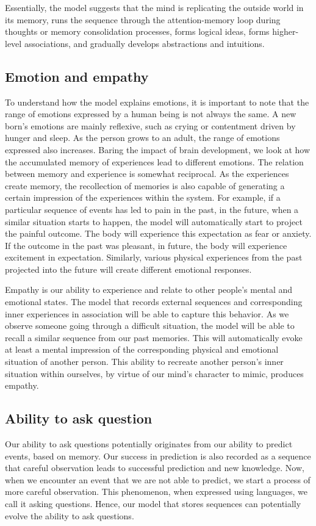 \documentclass[reprint,amsmath,amssymb,apr,aip,onecolumn, 11pt]{revtex4-1}
\begin{document}
 Essentially, the model suggests that the mind is replicating the outside world in its memory, runs the sequence through the attention-memory loop during thoughts or memory consolidation processes, forms logical ideas, forms higher-level associations, and gradually develops abstractions and intuitions. 



\subsection{Emotion and empathy}
To understand how the model explains emotions, it is important to note that the range of emotions expressed by a human being is not always the same. A new born's emotions are mainly reflexive, such as crying or contentment driven by hunger and sleep. As the person grows to an adult, the range of emotions expressed also increases\cite{Berk_2017}. Baring the impact of brain development, we look at how the accumulated memory of experiences lead to different emotions. The relation between memory and experience is somewhat reciprocal. As the experiences create memory, the recollection of memories is also capable of generating a certain impression of the experiences within the system.  For example, if a particular sequence of events has led to pain in the past, in the future, when a similar situation starts to happen, the model will automatically start to project the painful outcome. The body will experience this expectation as fear or anxiety. If the outcome in the past was pleasant, in future, the body will experience excitement in expectation. Similarly, various physical experiences from the past projected into the future will create different emotional responses.

Empathy is our ability to experience and relate to other people's mental and emotional states. The model that records external sequences and corresponding inner experiences in association will be able to capture this behavior. As we observe someone going through a difficult situation, the model will be able to recall a similar sequence from our past memories. This will automatically evoke at least a mental impression of the corresponding physical and emotional situation of another person. This ability to recreate another person's inner situation within ourselves, by virtue of our mind's character to mimic, produces empathy.  

\subsection{Ability to ask question}
Our ability to ask questions potentially originates from our ability to predict events, based on memory. Our success in prediction is also recorded as a sequence that careful observation leads to successful prediction and new knowledge. Now, when we encounter an event that we are not able to predict, we start a process of more careful observation. This phenomenon, when expressed using languages, we call it asking questions. Hence, our model that stores sequences can potentially evolve the ability to ask questions. 
\end{document}
